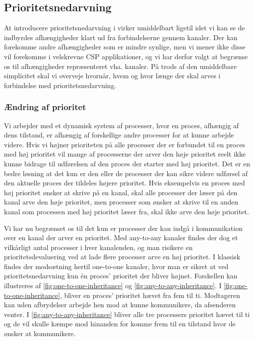 \subsection{Prioritetsnedarvning}\label{sec:rtp-pycsp-nedarvning}
At introducere prioritetsnedarvning i \pycsp virker umiddelbart ligetil idet vi kan se de indbyrdes afhængigheder klart ud fra forbindelserne gennem kanaler. Der kan forekomme andre afhængigheder som er mindre synlige, men vi mener ikke disse vil forekomme i velskrevne CSP applikationer, og vi har derfor valgt at begrænse os til afhængigheder repræsenteret vha. kanaler. På trods af den umiddelbare simplicitet skal vi overveje hvornår, hvem og hvor længe der skal arves i forbindelse med prioritetsnedarvning.

\subsubsection*{Ændring af prioritet}
Vi arbejder med et dynamisk system af processer, hvor en proces, afhængig af dens tilstand, er afhængig af forskellige andre processer for at kunne arbejde videre. 
Hvis vi højner prioriteten på alle processer der er forbundet til en proces med høj prioritet vil mange af processerne der arver den høje prioritet reelt ikke kunne bidrage til udførelsen af den proces der starter med høj prioritet. Det er en bedre løsning at det kun er den eller de processer der kan sikre videre udførsel af den aktuelle proces der tildeles højere prioritet. Hvis eksempelvis en proces med høj prioritet ønsker at skrive på en kanal, skal alle processer der læser på den kanal arve den høje prioritet, men processer som ønsker at skrive til en anden kanal som processen med høj prioritet læser fra, skal ikke arve den høje prioritet. 

Vi har nu begrænset os til det kun er  processer der kan indgå i kommunikation over en kanal der arver en prioritet. Med any-to-any kanaler findes der dog et vilkårligt antal processer i hver kanalenden, og man risikere en  prioritetsdevaluering ved at lade flere processer arve en høj prioritet. I klassisk \csp findes der modsætning hertil one-to-one kanaler, hvor man er sikret at ved prioritetsnedarvning kun én proces' prioritet der bliver højnet. Forskellen kan illustreres af \autoref{fig:one-to-one-inheritance} og \cref{fig:any-to-any-inheritance}. I \autoref{fig:one-to-one-inheritance}, bliver en proces' prioritet hævet fra fem til ti. Modtageren kan uden afbrydelser arbejde hen mod at kunne kommunikere, da afsenderen venter. I \autoref{fig:any-to-any-inheritance} bliver alle tre processers prioritet hævet til ti og de vil skulle kæmpe mod hinanden for komme frem til en tilstand hvor de ønsker at kommunikere. 

